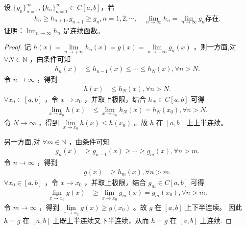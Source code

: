 \documentclass[../../main.tex]{subfiles}%
\begin{document}
\begin{example}
设 $\{g_n\}_{n=1}^{\infty}, \{h_n\}_{n=1}^{\infty} \subset C[a,b]$，若
\begin{align*}
h_n \geqslant  h_{n+1}, g_{n+1} \geqslant  g_n, n = 1, 2, \cdots, \quad
\lim_{n \to \infty} h_n = \lim_{n \to \infty} g_n \text{存在}.
\end{align*}
证明：$\lim_{n \to \infty} h_n$ 是连续函数。
\end{example}
\begin{proof}
记 $h\left( x \right) =\underset{n\rightarrow +\infty}{\lim}h_n\left( x \right) =g\left( x \right) =\underset{n\rightarrow +\infty}{\lim}g_n\left( x \right)$ ，则一方面,对 $\forall N\in \mathbb{N}$ ，由条件可知
\begin{align*}
h_n\left( x \right) &\leqslant h_{n-1}\left( x \right) \leqslant \cdots \leqslant h_N\left( x \right) ,\forall n>N.
\end{align*}
令 $n\rightarrow \infty$ ，得到
\begin{align*}
h\left( x \right) &\leqslant h_N\left( x \right) ,\forall n>N.
\end{align*}
$\forall x_0\in \left[ a,b \right]$ ，令 $x\rightarrow x_0$ ，并取上极限，结合 $h_N\in C\left[ a,b \right]$ 可得
\begin{align*}
\underset{x\rightarrow x_0}{\overline{\lim }}h\left( x \right) &\leqslant \underset{x\rightarrow x_0}{\overline{\lim }}h_N\left( x \right) =h_N\left( x_0 \right) ,\forall n>N.
\end{align*}
令 $N\rightarrow \infty$ ，得到 $\underset{x\rightarrow x_0}{\overline{\lim }}h\left( x \right) \leqslant h\left( x_0 \right)$ 。故 $h$ 在 $\left[ a,b \right]$ 上上半连续。

另一方面,对 $\forall m\in \mathbb{N}$ ，由条件可知
\begin{align*}
g_n\left( x \right) &\geqslant g_{n-1}\left( x \right) \geqslant \cdots \geqslant g_m\left( x \right) ,\forall n>m.
\end{align*}
令 $n\rightarrow \infty$ ，得到
\begin{align*}
g\left( x \right) &\geqslant h_m\left( x \right) ,\forall n>m.
\end{align*}
$\forall x_0\in \left[ a,b \right]$ ，令 $x\rightarrow x_0$ ，并取上极限，结合 $g_m\in C\left[ a,b \right]$ 可得
\begin{align*}
\underset{x\rightarrow x_0}{\underline{\lim }}g\left( x \right) &\geqslant \underset{x\rightarrow x_0}{\underline{\lim }}g_m\left( x \right) =g_m\left( x_0 \right) ,\forall n>m.
\end{align*}
令 $m\rightarrow \infty$ ，得到 $\underset{x\rightarrow x_0}{\underline{\lim }}g\left( x \right) \geqslant g\left( x_0 \right)$ 。故 $g$ 在 $\left[ a,b \right]$ 上下半连续。
因此 $h=g$ 在 $\left[ a,b \right]$ 上既上半连续又下半连续，从而 $h=g$ 在 $\left[ a,b \right]$ 上连续.
\end{proof}
\end{document}

